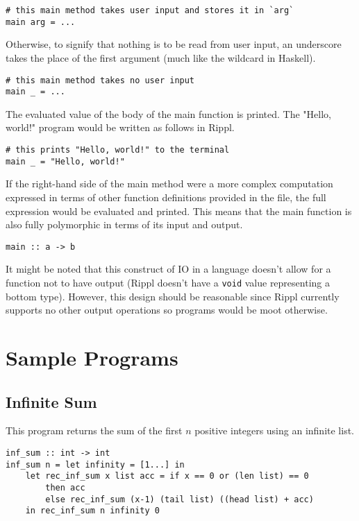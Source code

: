 \documentclass[5pt]{article}
\begin{document}
\begin{lstlisting}[language=rippl]
# this main method takes user input and stores it in `arg`
main arg = ... 
\end{lstlisting}

Otherwise, to signify that nothing is to be read from user input, an underscore takes the place of the first argument (much like the wildcard in Haskell). \\

\begin{lstlisting}[language=rippl]
# this main method takes no user input
main _ = ...    
\end{lstlisting}

The evaluated value of the body of the main function is printed. The "Hello, world!" program would be written as follows in Rippl.

\begin{lstlisting}[language=rippl]
# this prints "Hello, world!" to the terminal
main _ = "Hello, world!"
\end{lstlisting}

If the right-hand side of the main method were a more complex computation expressed in terms of other function definitions provided in the file, the full expression would be evaluated and printed. This means that the main function is also fully polymorphic in terms of its input and output. \\

\begin{lstlisting}[language=rippl]
main :: a -> b
\end{lstlisting}

It might be noted that this construct of IO in a language doesn't allow for a function not to have output (Rippl doesn't have a \texttt{void} value representing a bottom type). However, this design should be reasonable since Rippl currently supports no other output operations so programs would be moot otherwise. \\
\section{Sample Programs}
\subsection{Infinite Sum}
This program returns the sum of the first $n$ positive integers using an 
infinite list.
\begin{lstlisting}[language=rippl]
inf_sum :: int -> int
inf_sum n = let infinity = [1...] in
    let rec_inf_sum x list acc = if x == 0 or (len list) == 0
        then acc
        else rec_inf_sum (x-1) (tail list) ((head list) + acc)
    in rec_inf_sum n infinity 0
\end{lstlisting}
\end{document}
